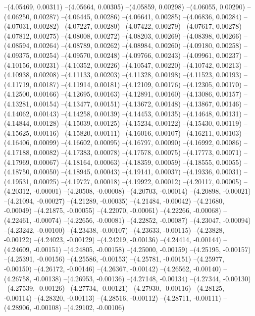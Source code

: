 --(4.05469, 0.00311)
--(4.05664, 0.00305)
--(4.05859, 0.00298)
--(4.06055, 0.00290)
--(4.06250, 0.00287)
--(4.06445, 0.00286)
--(4.06641, 0.00285)
--(4.06836, 0.00284)
--(4.07031, 0.00282)
--(4.07227, 0.00280)
--(4.07422, 0.00279)
--(4.07617, 0.00278)
--(4.07812, 0.00275)
--(4.08008, 0.00272)
--(4.08203, 0.00269)
--(4.08398, 0.00266)
--(4.08594, 0.00264)
--(4.08789, 0.00262)
--(4.08984, 0.00260)
--(4.09180, 0.00258)
--(4.09375, 0.00254)
--(4.09570, 0.00248)
--(4.09766, 0.00243)
--(4.09961, 0.00237)
--(4.10156, 0.00231)
--(4.10352, 0.00226)
--(4.10547, 0.00220)
--(4.10742, 0.00213)
--(4.10938, 0.00208)
--(4.11133, 0.00203)
--(4.11328, 0.00198)
--(4.11523, 0.00193)
--(4.11719, 0.00187)
--(4.11914, 0.00181)
--(4.12109, 0.00176)
--(4.12305, 0.00170)
--(4.12500, 0.00166)
--(4.12695, 0.00163)
--(4.12891, 0.00160)
--(4.13086, 0.00157)
--(4.13281, 0.00154)
--(4.13477, 0.00151)
--(4.13672, 0.00148)
--(4.13867, 0.00146)
--(4.14062, 0.00143)
--(4.14258, 0.00139)
--(4.14453, 0.00135)
--(4.14648, 0.00131)
--(4.14844, 0.00128)
--(4.15039, 0.00125)
--(4.15234, 0.00122)
--(4.15430, 0.00119)
--(4.15625, 0.00116)
--(4.15820, 0.00111)
--(4.16016, 0.00107)
--(4.16211, 0.00103)
--(4.16406, 0.00099)
--(4.16602, 0.00095)
--(4.16797, 0.00090)
--(4.16992, 0.00086)
--(4.17188, 0.00082)
--(4.17383, 0.00078)
--(4.17578, 0.00075)
--(4.17773, 0.00071)
--(4.17969, 0.00067)
--(4.18164, 0.00063)
--(4.18359, 0.00059)
--(4.18555, 0.00055)
--(4.18750, 0.00050)
--(4.18945, 0.00043)
--(4.19141, 0.00037)
--(4.19336, 0.00031)
--(4.19531, 0.00025)
--(4.19727, 0.00018)
--(4.19922, 0.00012)
--(4.20117, 0.00005)
--(4.20312, -0.00001)
--(4.20508, -0.00008)
--(4.20703, -0.00014)
--(4.20898, -0.00021)
--(4.21094, -0.00027)
--(4.21289, -0.00035)
--(4.21484, -0.00042)
--(4.21680, -0.00049)
--(4.21875, -0.00055)
--(4.22070, -0.00061)
--(4.22266, -0.00068)
--(4.22461, -0.00074)
--(4.22656, -0.00081)
--(4.22852, -0.00087)
--(4.23047, -0.00094)
--(4.23242, -0.00100)
--(4.23438, -0.00107)
--(4.23633, -0.00115)
--(4.23828, -0.00122)
--(4.24023, -0.00129)
--(4.24219, -0.00136)
--(4.24414, -0.00144)
--(4.24609, -0.00151)
--(4.24805, -0.00158)
--(4.25000, -0.00159)
--(4.25195, -0.00157)
--(4.25391, -0.00156)
--(4.25586, -0.00153)
--(4.25781, -0.00151)
--(4.25977, -0.00150)
--(4.26172, -0.00146)
--(4.26367, -0.00142)
--(4.26562, -0.00140)
--(4.26758, -0.00138)
--(4.26953, -0.00136)
--(4.27148, -0.00134)
--(4.27344, -0.00130)
--(4.27539, -0.00126)
--(4.27734, -0.00121)
--(4.27930, -0.00116)
--(4.28125, -0.00114)
--(4.28320, -0.00113)
--(4.28516, -0.00112)
--(4.28711, -0.00111)
--(4.28906, -0.00108)
--(4.29102, -0.00106)
